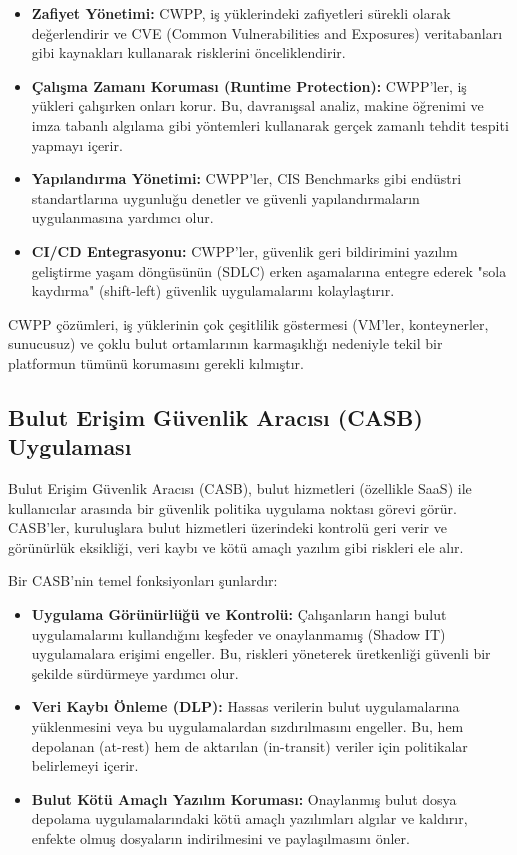 \begin{itemize}
    \item \textbf{Zafiyet Yönetimi:} CWPP, iş yüklerindeki zafiyetleri sürekli olarak değerlendirir ve CVE (Common Vulnerabilities and Exposures) veritabanları gibi kaynakları kullanarak risklerini önceliklendirir.
    \item \textbf{Çalışma Zamanı Koruması (Runtime Protection):} CWPP'ler, iş yükleri çalışırken onları korur. Bu, davranışsal analiz, makine öğrenimi ve imza tabanlı algılama gibi yöntemleri kullanarak gerçek zamanlı tehdit tespiti yapmayı içerir.
    \item \textbf{Yapılandırma Yönetimi:} CWPP'ler, CIS Benchmarks gibi endüstri standartlarına uygunluğu denetler ve güvenli yapılandırmaların uygulanmasına yardımcı olur.
    \item \textbf{CI/CD Entegrasyonu:} CWPP'ler, güvenlik geri bildirimini yazılım geliştirme yaşam döngüsünün (SDLC) erken aşamalarına entegre ederek "sola kaydırma" (shift-left) güvenlik uygulamalarını kolaylaştırır.
\end{itemize}

CWPP çözümleri, iş yüklerinin çok çeşitlilik göstermesi (VM'ler, konteynerler, sunucusuz) ve çoklu bulut ortamlarının karmaşıklığı nedeniyle tekil bir platformun tümünü korumasını gerekli kılmıştır.

\subsection{Bulut Erişim Güvenlik Aracısı (CASB) Uygulaması}

Bulut Erişim Güvenlik Aracısı (CASB), bulut hizmetleri (özellikle SaaS) ile kullanıcılar arasında bir güvenlik politika uygulama noktası görevi görür. CASB'ler, kuruluşlara bulut hizmetleri üzerindeki kontrolü geri verir ve görünürlük eksikliği, veri kaybı ve kötü amaçlı yazılım gibi riskleri ele alır.

Bir CASB'nin temel fonksiyonları şunlardır:

\begin{itemize}
    \item \textbf{Uygulama Görünürlüğü ve Kontrolü:} Çalışanların hangi bulut uygulamalarını kullandığını keşfeder ve onaylanmamış (Shadow IT) uygulamalara erişimi engeller. Bu, riskleri yöneterek üretkenliği güvenli bir şekilde sürdürmeye yardımcı olur.
    \item \textbf{Veri Kaybı Önleme (DLP):} Hassas verilerin bulut uygulamalarına yüklenmesini veya bu uygulamalardan sızdırılmasını engeller. Bu, hem depolanan (at-rest) hem de aktarılan (in-transit) veriler için politikalar belirlemeyi içerir.
    \item \textbf{Bulut Kötü Amaçlı Yazılım Koruması:} Onaylanmış bulut dosya depolama uygulamalarındaki kötü amaçlı yazılımları algılar ve kaldırır, enfekte olmuş dosyaların indirilmesini ve paylaşılmasını önler.
\end{itemize}

